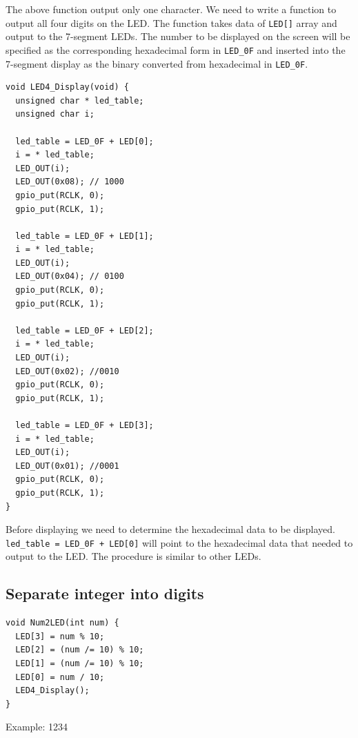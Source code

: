 \documentclass[13pt,a4paper,twoside]{report}
\begin{document}
The above function output only one character. We need to write a function to output all four digits on the LED. The function takes data of \texttt{LED[]} array and output to the 7-segment LEDs. The number to be displayed on the screen will be specified as the corresponding hexadecimal form in \texttt{LED\_0F} and inserted into the 7-segment display as the binary converted from hexadecimal in \texttt{LED\_0F}.

\begin{verbatim}
void LED4_Display(void) {
  unsigned char * led_table;
  unsigned char i;

  led_table = LED_0F + LED[0];
  i = * led_table;
  LED_OUT(i);
  LED_OUT(0x08); // 1000
  gpio_put(RCLK, 0);
  gpio_put(RCLK, 1);

  led_table = LED_0F + LED[1];
  i = * led_table;
  LED_OUT(i);
  LED_OUT(0x04); // 0100
  gpio_put(RCLK, 0);
  gpio_put(RCLK, 1);

  led_table = LED_0F + LED[2];
  i = * led_table;
  LED_OUT(i);
  LED_OUT(0x02); //0010
  gpio_put(RCLK, 0);
  gpio_put(RCLK, 1);

  led_table = LED_0F + LED[3];
  i = * led_table;
  LED_OUT(i);
  LED_OUT(0x01); //0001
  gpio_put(RCLK, 0);
  gpio_put(RCLK, 1);
}
\end{verbatim}

Before displaying we need to determine the hexadecimal data to be displayed. \texttt{led\_table = LED\_0F + LED[0]} will point to the hexadecimal data that needed to output to the LED. The procedure is similar to other LEDs.

\subsection{Separate integer into digits}
\begin{verbatim}
void Num2LED(int num) {
  LED[3] = num % 10;
  LED[2] = (num /= 10) % 10;
  LED[1] = (num /= 10) % 10;
  LED[0] = num / 10;
  LED4_Display();
}
\end{verbatim}
Example: 1234
\end{document}
